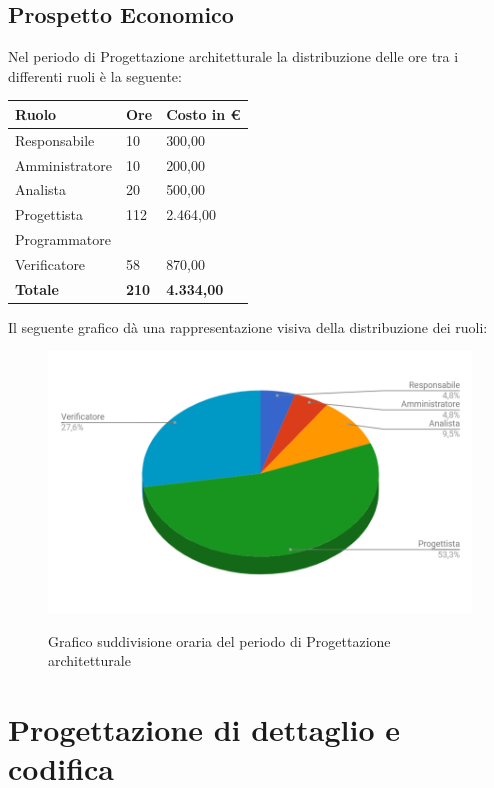 \documentclass[PianoDiProgetto.tex]{subfiles}
\begin{document}
\subsection{Prospetto Economico}
Nel periodo di Progettazione architetturale la distribuzione delle ore tra i differenti ruoli è la seguente:
\begin{center}
\begin{table}[htbp]
	\centering
	\renewcommand\arraystretch{1.5}
	\begin{tabularx}{\textwidth}{p{5cm}|p{4cm}|p{4cm}}
		\hline
		\textbf{Ruolo} & \textbf{Ore} & \textbf{Costo in \euro} \\
		\hline
		Responsabile & 10 & 300,00 \\
		\hline
		Amministratore & 10 & 200,00 \\
		\hline
		Analista & 20 & 500,00 \\
		\hline
		Progettista & 112 & 2.464,00 \\
		\hline
		Programmatore & \ & \ \\
		\hline
		Verificatore & 58 & 870,00 \\
		\hline
		\textbf{Totale} & \textbf{210} & \textbf{4.334,00}\\
		\hline
	\end{tabularx}
\end{table}
\end{center}
Il seguente grafico dà una rappresentazione visiva della distribuzione dei ruoli:
\begin{figure}[h]
	\includegraphics[width=12.5cm]{images/prospettoEconomico/progArch.png}
	\label{fig:foo}
	\caption{Grafico suddivisione oraria del periodo di Progettazione architetturale}
\end{figure} 
\newpage
\section{Progettazione di dettaglio e codifica}
\end{document}
